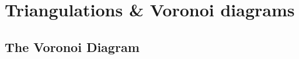 
\graphicspath{{dtvd/}}


\newcommand{\Orient}{O\textsc{rientation}\xspace}
\newcommand{\walk}{W\textsc{alk}\xspace}
\newcommand{\Incircle}{I\textsc{n}C\textsc{ircle}\xspace}

\chapter{Triangulations \& Voronoi diagrams}%
\label{chap:dtvd}



\section{The Voronoi Diagram}

